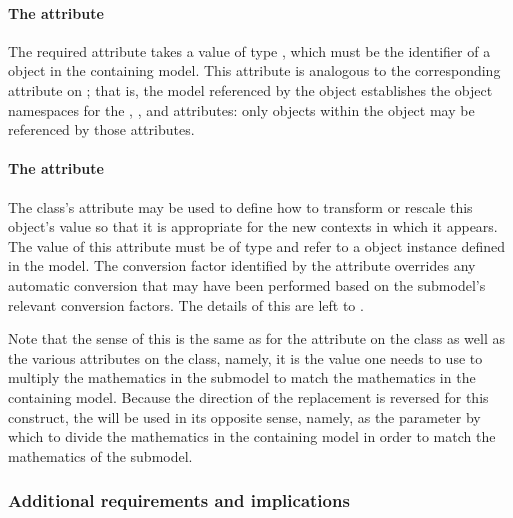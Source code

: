 \paragraph{The \fixttspace{} attribute}
\label{replacedby-submodelref}

The required attribute  takes a value of type
, which must be the identifier of a \Submodel object in
the containing model.  This attribute is analogous to the corresponding
attribute on \ReplacedElement; that is, the model referenced by the
\Submodel object establishes the object namespaces for the
, ,  and 
attributes: only objects within the \Model object may be referenced by
those attributes.


\paragraph{The \fixttspace{} attribute}
\label{replacedby-conversionfactor}

The \ReplacedBy class's  attribute may be used to
define how to transform or rescale this object's value so that it is
appropriate for the new contexts in which it appears.  The value of this
attribute must be of type  and refer to a
\Parameter object instance defined in the model.  The conversion factor
identified by the  attribute overrides any
automatic conversion that may have been performed based on the
submodel's relevant conversion factors.  The details of this are left to
.

Note that the sense of this  is the same as for
the  attribute on the \ReplacedElement class as 
well as the various  attributes on the \Submodel
class, namely, it is the value one needs to use to multiply the mathematics
in the submodel to match the mathematics in the containing model.
Because the direction of the replacement is reversed for this construct,
the  will be used in its opposite sense, namely,
as the parameter by which to divide the mathematics in the containing
model in order to match the mathematics of the submodel.


\subsubsection{Additional requirements and implications}
\label{replacedelement-additional}

